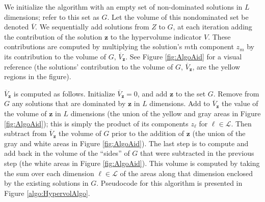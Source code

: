 We initialize the algorithm with an empty set of non-dominated solutions in $L$ dimensions; refer to this set as $G$. Let the volume of this nondominated set be denoted $\overbar{V}$. We sequentially add solutions from $Z$ to $G$, at each iteration adding the contribution of the solution $\mathbf{z}$ to the hypervolume indicator $V$. These contributions are computed by multiplying the solution's $m$th component $z_m$ by its contribution to the volume of $G$, $\overbar{V}_\mathbf{z}$. See Figure \ref{fig:AlgoAid} for a visual reference (the solutions' contribution to the volume of $G$, $\overbar{V}_\mathbf{z}$, are the yellow regions in the figure).

$\overbar{V}_\mathbf{z}$ is computed as follows. Initialize $\overbar{V}_\mathbf{z} = 0$, and add $\mathbf{z}$ to the set $G$. Remove from $G$ any solutions that are dominated by $\mathbf{z}$ in $L$ dimensions. Add to $\overbar{V}_\mathbf{z}$ the value of the volume of $\mathbf{z}$ in $L$ dimensions (the union of the yellow and gray areas in Figure \ref{fig:AlgoAid}); this is simply the product of its components $z_\ell$ for $\ell \in \mathcal{L}$. Then subtract from $\overbar{V}_\mathbf{z}$ the volume of $G$ prior to the addition of $\mathbf{z}$ (the union of the gray and white areas in Figure \ref{fig:AlgoAid}). The last step is to compute and add back in the volume of the ``sides'' of $G$ that were subtracted in the previous step (the white areas in Figure \ref{fig:AlgoAid}). This volume is computed by taking the sum over each dimension $\ell \in \mathcal{L}$ of the areas along that dimension enclosed by the existing solutions in $G$. Pseudocode for this algorithm is presented in Figure \ref{algo:HypervolAlgo}.

